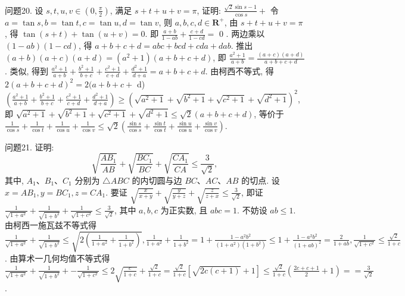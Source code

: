 问题20. 设 $s, t, u, v \in\left(0, \frac{\pi}{2}\right)$, 满足 $s+t+u+v=\pi$, 证明: $\frac{\sqrt{2} \sin s-1}{\cos s}+$
令 $a=\tan s, b=\tan t, c=\tan u, d=\tan v$, 则 $a, b, c, d \in \mathbf{R}^{+}$, 由 $s+t+u+v=\pi$, 得 $\tan (s+t)+\tan (u+v)=0$. 即 $\frac{a+b}{1-a b}+\frac{c+d}{1-c d}=$ 0 . 两边乘以 $(1-a b)(1-c d)$, 得 $a+b+c+d=a b c+b c d+c d a+d a b$. 推出 $(a+b)(a+c)(a+d)=\left(a^2+1\right)(a+b+c+d)$, 即 $\frac{a^2+1}{a+b}= \frac{(a+c)(a+d)}{a+b+c+d}$. 类似, 得到 $\frac{a^2+1}{a+b}+\frac{b^2+1}{b+c}+\frac{c^2+1}{c+d}+\frac{d^2+1}{d+a}=a+b+c+ d$. 由柯西不等式, 得 $2(a+b+c+d)^2=2(a+b+c+$ d) $\left(\frac{a^2+1}{a+b}+\frac{b^2+1}{b+c}+\frac{c^2+1}{c+d}+\frac{d^2+1}{d+a}\right) \geqslant\left(\sqrt{a^2+1}+\sqrt{b^2+1}+\sqrt{c^2+1}+\right. \left.\sqrt{d^2+1}\right)^2$, 即 $\sqrt{a^2+1}+\sqrt{b^2+1}+\sqrt{c^2+1}+\sqrt{d^2+1} \leqslant \sqrt{2}(a+b+c+ d)$, 等价于 $\frac{1}{\cos s}+\frac{1}{\cos t}+\frac{1}{\cos u}+\frac{1}{\cos v} \leqslant \sqrt{2}\left(\frac{\sin s}{\cos s}+\frac{\sin t}{\cos t}+\frac{\sin u}{\cos u}+\frac{\sin v}{\cos v}\right)$.



问题21. 证明:
$$
\sqrt{\frac{A B_1}{A B}}+\sqrt{\frac{B C_1}{B C}}+\sqrt{\frac{C A_1}{C A}} \leqslant \frac{3}{\sqrt{2}},
$$
其中, $A_1 、 B_1 、 C_1$ 分别为 $\triangle A B C$ 的内切圆与边 $B C 、 A C 、 A B$ 的切点.
设 $x=A B_1, y=B C_1, z=C A_1$. 要证 $\sqrt{\frac{x}{x+y}}+\sqrt{\frac{y}{y+z}}+\sqrt{\frac{z}{z+x}} \leqslant \frac{3}{\sqrt{2}}$, 即证 $\frac{1}{\sqrt{1+a^2}}+\frac{1}{\sqrt{1+b^2}}+\frac{1}{\sqrt{1+c^2}} \leqslant \frac{3}{\sqrt{2}}$, 其中 $a, b, c$ 为正实数, 且 $a b c=1$. 不妨设 $a b \leqslant 1$. 由柯西一施瓦兹不等式得 $\frac{1}{\sqrt{1+a^2}}+ \frac{1}{\sqrt{1+b^2}} \leqslant \sqrt{2\left(\frac{1}{1+a^2}+\frac{1}{1+b^2}\right)}, \frac{1}{1+a^2}+\frac{1}{1+b^2}=1+\frac{1-a^2 b^2}{\left(1+a^2\right)\left(1+b^2\right)} \leqslant 1+ \frac{1-a^2 b^2}{(1+a b)^2}=\frac{2}{1+a b}, \frac{1}{\sqrt{1+c^2}} \leqslant \frac{\sqrt{2}}{1+c}$. 由算术一几何均值不等式得 $\frac{1}{\sqrt{1+a^2}}+ \frac{1}{\sqrt{1+b^2}}+-\frac{1}{\sqrt{1+c^2}} \leqslant 2 \sqrt{\frac{c}{1+c}}+\frac{\sqrt{2}}{1+c}=\frac{\sqrt{2}}{1+c}[\sqrt{2 c(c+1)}+1] \leqslant \frac{\sqrt{2}}{1+c}\left(\frac{2 c+c+1}{2}+1\right)==\frac{3}{\sqrt{2}}$.



